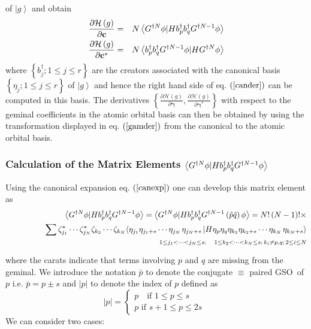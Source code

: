 \documentclass{article}
\begin{document}
of $\left| g\right\rangle $ and obtain 
\begin{eqnarray}
\frac{\partial \mathcal{H}\left( g\right) }{\partial \mathbf{c}}
&=&N\left\langle G^{\dagger N}\phi |Hb_{p}^{\dagger }b_{q}^{\dagger
}G^{\dagger N-1}\phi \right\rangle  \notag \\
\frac{\partial \mathcal{H}\left( g\right) }{\partial \mathbf{c}^{\ast }}
&=&N\left\langle b_{p}^{\dagger }b_{q}^{\dagger }G^{\dagger N-1}\phi
|HG^{\dagger N}\phi \right\rangle  \label{cander}
\end{eqnarray}%
where $\left\{ b_{j}^{\dagger };1\leq j\leq r\right\} $ are the creators
associated with the canonical basis $\left\{ \eta _{j};1\leq j\leq r\right\} 
$ of $\left| g\right\rangle $ and hence the right hand side of eq. $\left( %
\ref{cander}\right) $ can be computed in this basis. The derivatives $%
\left\{ \frac{\partial \mathcal{H}\left( g\right) }{\partial \mathbf{\gamma }%
},\frac{\partial \mathcal{H}\left( g\right) }{\partial \mathbf{\gamma }%
^{\ast }}\right\} $ with respect to the geminal coefficients in the atomic
orbital basis can then be obtained by using the transformation displayed in
eq. $\left( \ref{gamder}\right) $ from the canonical to the atomic orbital
basis.

\subsubsection{Calculation of the Matrix Elements $\left\langle G^{\dagger N}%
\protect\phi |Hb_{p}^{\dagger }b_{q}^{\dagger }G^{\dagger N-1}\protect\phi %
\right\rangle $}

Using the canonical expansion eq. $\left( \ref{canexp}\right) $ one can
develop this matrix element as 
\begin{eqnarray}
&&\left\langle G^{\dagger N}\phi |Hb_{p}^{\dagger }b_{q}^{\dagger
}G^{\dagger N-1}\phi \right\rangle =\left\langle G^{\dagger N}\phi
|Hb_{p}^{\dagger }b_{q}^{\dagger }G^{\dagger N-1}\left( \hat{p}\hat{q}%
\right) \phi \right\rangle =N!\left( N-1\right) !\times  \notag \\
&&\qquad \qquad \sum \zeta _{j_{1}}^{\ast }\cdots \zeta _{j_{N}}^{\ast
}\zeta _{k_{2}}\cdots \zeta _{k_{N}}\langle \eta _{j_{1}}\eta
_{j_{1}+s}\cdots \eta _{j_{N}\,}\eta _{j_{N}+s}\left| H\eta _{p}\eta
_{q}\eta _{k_{2}}\eta _{k_{2}+s}\cdots \eta _{k_{N}\,}\eta
_{k_{N}+s}\right\rangle  \notag \\
&&\overset{1\leq j_{1}<\cdots <j_{N}\leq s;\quad 1\leq k_{2}<\cdots
<k_{N}\leq s;\,k_{i}\neq p,q;\,2\leq i\leq N}{}  \label{Derexp}
\end{eqnarray}%
where the carats indicate that terms involving $p$ and $q$ are missing from
the geminal. We introduce the notation $\bar{p}$ to denote the conjugate $%
\equiv $ paired GSO\ of $p$ i.e. $\bar{p}=p\pm s$ and $\left| p\right| $ to
denote the index of $p$ defined as 
\begin{equation}
\left| p\right| =\left\{ 
\begin{array}{c}
p\quad \text{if \ }1\leq p\leq s\qquad \\ 
p\text{ \ if \ }s+1\leq p\leq 2s%
\end{array}%
\right.
\end{equation}%
We can consider two cases:
\end{document}
